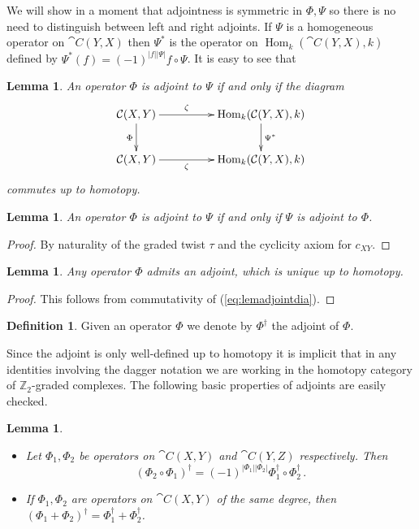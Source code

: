 \documentclass{compositio}
\newtheorem{lemma}[theorem]{Lemma}
\theoremstyle{definition}
\newtheorem{definition}[theorem]{Definition}
\numberwithin{equation}{section}
\def\Hom{\operatorname{Hom}}
\begin{document}
We will show in a moment that adjointness is symmetric in $\Phi, \Psi$ so there is no need to distinguish between left and right adjoints. If $\Psi$ is a homogeneous operator on $\cat{C}(Y,X)$ then $\Psi^*$ is the operator on $\Hom_k(\cat{C}(Y,X),k)$ defined by $\Psi^*(f) = (-1)^{|f||\Psi|} f \circ \Psi$. It is easy to see that

\begin{lemma} An operator $\Phi$ is adjoint to $\Psi$ if and only if the diagram
\begin{equation}\label{eq:lemadjointdia}
\xymatrix@C+2pc{
\cat{C}(X,Y) \ar[d]_\Phi \ar[r]^-{\zeta} & \Hom_k( \cat{C}(Y,X), k ) \ar[d]^{\Psi^*}\\
\cat{C}(X,Y) \ar[r]_-{\zeta} & \Hom_k( \cat{C}(Y,X), k)
}
\end{equation}
commutes up to homotopy.
\end{lemma}

\begin{lemma} An operator $\Phi$ is adjoint to $\Psi$ if and only if $\Psi$ is adjoint to $\Phi$.
\end{lemma}
\begin{proof}
By naturality of the graded twist $\tau$ and the cyclicity axiom for $c_{XY}$.
\end{proof}

\begin{lemma} Any operator $\Phi$ admits an adjoint, which is unique up to homotopy. 
\end{lemma}
\begin{proof}
This follows from commutativity of (\ref{eq:lemadjointdia}).
\end{proof}

\begin{definition} Given an operator $\Phi$ we denote by $\Phi^{\dagger}$ the adjoint of $\Phi$.
\end{definition}

Since the adjoint is only well-defined up to homotopy it is implicit that in any identities involving the dagger notation we are working in the homotopy category of $\mathbb{Z}_2$-graded complexes. The following basic properties of adjoints are easily checked.

\begin{lemma} 
\begin{itemize}
\item[(i)] Let $\Phi_1, \Phi_2$ be operators on $\cat{C}(X,Y)$ and $\cat{C}(Y,Z)$ respectively. Then
\[
(\Phi_2 \circ \Phi_1)^{\dagger} = (-1)^{|\Phi_1||\Phi_2|} \Phi_1^{\dagger} \circ \Phi_2^{\dagger}\,.
\]
\item[(ii)] If $\Phi_1, \Phi_2$ are operators on $\cat{C}(X,Y)$ of the same degree, then $(\Phi_1 + \Phi_2)^{\dagger} = \Phi_1^{\dagger} + \Phi_2^{\dagger}$.
\end{itemize}
\end{lemma}
\end{document}
